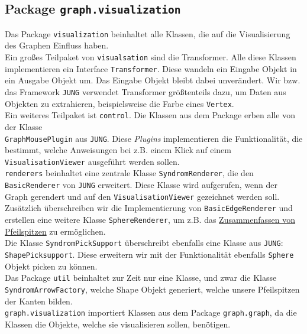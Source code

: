 \documentclass[enabledeprecatedfontcommands,fontsize=11pt,paper=a4,twoside]{scrartcl}
\begin{document}
\subsection{Package \texttt{graph.visualization}}

Das Package \texttt{visualization} beinhaltet alle Klassen, die auf die Visualisierung des Graphen Einfluss haben. \\
Ein großes Teilpaket von \texttt{visualsation} sind die Transformer.  Alle diese Klassen implementieren ein Interface \texttt{Transformer}. Diese wandeln ein Eingabe Objekt in ein Ausgabe Objekt um. Das Eingabe Objekt bleibt dabei unverändert. Wir bzw. das Framework \texttt{JUNG} verwendet Transformer größtenteils dazu, um Daten aus Objekten zu extrahieren, beispielsweise die Farbe eines \texttt{Vertex}. \\
Ein weiteres Teilpaket ist \texttt{control}. Die Klassen aus dem Package erben alle von der Klasse \\ \texttt{GraphMousePlugin} aus \texttt{JUNG}. Diese \textit{Plugins} implementieren die Funktionalität, die bestimmt, welche Anweisungen bei z.B. einem Klick auf einem \texttt{VisualisationViewer} ausgeführt werden sollen. \\
\texttt{renderers} beinhaltet eine zentrale Klasse \texttt{SyndromRenderer}, die den \texttt{BasicRenderer} von \texttt{JUNG} erweitert. Diese Klasse wird aufgerufen, wenn der Graph gerendert und auf den \texttt{VisualisationViewer} gezeichnet werden soll. Zusätzlich überschreiben wir die Implementierung von \texttt{BasicEdgeRenderer} und erstellen eine weitere Klasse \texttt{SphereRenderer}, um z.B. das \hyperlink{cc}{Zusammenfassen von Pfeilspitzen} zu ermöglichen. \\
Die Klasse \texttt{SyndromPickSupport} überschreibt ebenfalls eine Klasse aus \texttt{JUNG}: \texttt{ShapePicksupport}. Diese erweitern wir mit der Funktionalität ebenfalls \texttt{Sphere} Objekt picken zu können. \\ 
Das Package \texttt{util} beinhaltet zur Zeit nur eine Klasse, und zwar die Klasse \texttt{SyndromArrowFactory}, welche Shape Objekt generiert, welche unsere Pfeilspitzen der Kanten bilden. \\
\texttt{graph.visualization} importiert Klassen aus dem Package \texttt{graph.graph}, da die Klassen die Objekte, welche sie visualisieren sollen, benötigen. \\



\end{document}
